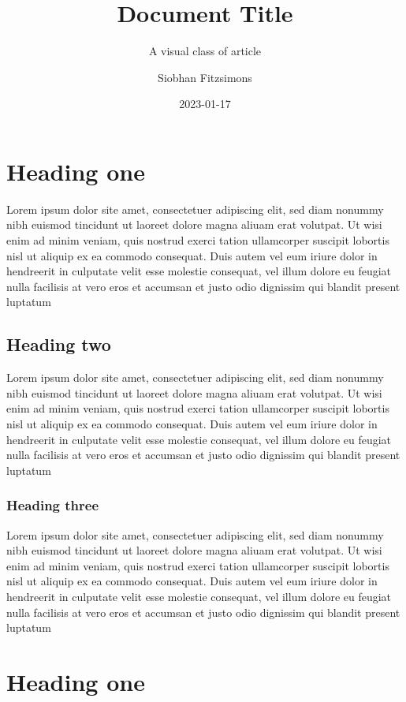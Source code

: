 \documentclass{csnote}
\title{Document Title}
\subtitle{A visual class of article}
\author{Siobhan Fitzsimons}
\date{2023-01-17}
\begin{document}
\maketitle

\section{Heading one}

Lorem ipsum dolor site amet, consectetuer adipiscing elit, sed diam nonummy nibh euismod tincidunt ut laoreet dolore magna aliuam erat volutpat. Ut wisi enim ad minim veniam, quis nostrud exerci tation ullamcorper suscipit lobortis nisl ut aliquip ex ea commodo consequat. Duis autem vel eum iriure dolor in hendreerit in culputate velit esse molestie consequat, vel illum dolore eu feugiat nulla facilisis at vero eros et accumsan et justo odio dignissim qui blandit present luptatum  

\subsection{Heading two}

Lorem ipsum dolor site amet, consectetuer adipiscing elit, sed diam nonummy nibh euismod tincidunt ut laoreet dolore magna aliuam erat volutpat. Ut wisi enim ad minim veniam, quis nostrud exerci tation ullamcorper suscipit lobortis nisl ut aliquip ex ea commodo consequat. Duis autem vel eum iriure dolor in hendreerit in culputate velit esse molestie consequat, vel illum dolore eu feugiat nulla facilisis at vero eros et accumsan et justo odio dignissim qui blandit present luptatum  

\subsubsection{Heading three}

Lorem ipsum dolor site amet, consectetuer adipiscing elit, sed diam nonummy nibh euismod tincidunt ut laoreet dolore magna aliuam erat volutpat. Ut wisi enim ad minim veniam, quis nostrud exerci tation ullamcorper suscipit lobortis nisl ut aliquip ex ea commodo consequat. Duis autem vel eum iriure dolor in hendreerit in culputate velit esse molestie consequat, vel illum dolore eu feugiat nulla facilisis at vero eros et accumsan et justo odio dignissim qui blandit present luptatum  

\section{Heading one}
\end{document}
